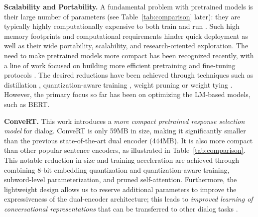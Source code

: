 \documentclass[11pt,a4paper]{article}
\begin{document}
\vspace{1.4mm}
\noindent \textbf{Scalability and Portability.} 
A fundamental problem with pretrained models is their large number of parameters (see Table~\ref{tab:comparison} later): they are typically highly computationally expensive to both train and run \cite{Liu:2019roberta}. 
 Such high memory footprints and computational requirements hinder quick deployment as well as their wide portability, scalability, and research-oriented exploration. The need to make pretrained models more compact has been recognized recently, with a line of work focused on building more efficient pretraining and fine-tuning protocols \cite{Tang:2019arxiv,Sanh:2019arxiv}. The desired reductions have been achieved through techniques such as distillation \cite{Sanh:2019arxiv}, quantization-aware training \cite{Zafrir:2019arxiv}, weight pruning \cite{Michel:2019nips} or weight tying \cite{Lan:2019albert}. However, the primary focus so far has been on optimizing the LM-based models, such as BERT.
 
 \vspace{1.4mm}
\noindent \textbf{ConveRT.} 
This work introduces a {\em more compact pretrained response selection model} for dialog. ConveRT is only 59MB in size, making it significantly smaller than the previous state-of-the-art dual encoder (444MB). It is also more compact than other popular sentence encoders, as illustrated in Table~\ref{tab:comparison}. This notable reduction in size and training acceleration are achieved through combining 8-bit embedding quantization and quantization-aware training, subword-level parameterization, and pruned self-attention. Furthermore, the lightweight design allows us to reserve additional parameters to improve the expressiveness of the dual-encoder architecture; this leads to \textit{improved learning of conversational representations} that can be transferred to other dialog tasks \cite{Casanueva:2020ws,Bunk:2020arxiv}. 
\end{document}
